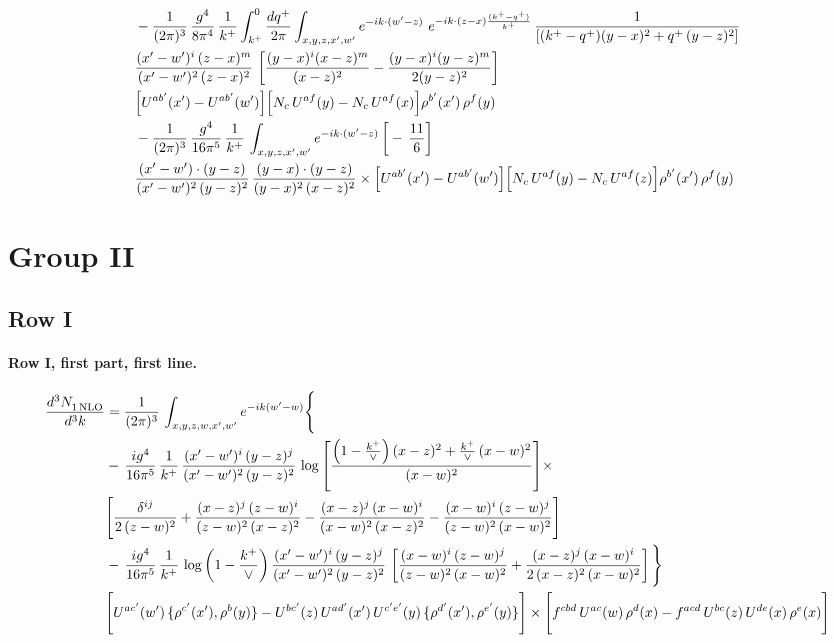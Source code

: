 \documentclass[10pt]{article}
\numberwithin{equation}{section}
\begin{document}
\begin{align}
& - \frac{1}{(2\pi)^{3}}\,\frac{g^{4}}{8\pi^{4}}\,\frac{1}{k^{+}}\int_{k^{+}}^{0}\frac{dq^{+}}{2\pi}\int_{x,y,z,x',w'}e^{-ik\cdot(w'-z)}\ e^{-ik\cdot(z-x)\frac{(k^{+}-q^{+})}{k^{+}}}\,\frac{1}{\left[(k^{+}-q^{+})(y-x)^{2}+q^{+}\,(y-z)^{2}\right]}\notag \\ & \frac{(x'-w')^{i}\,(z-x)^{m}}{(x'-w')^{2}\,(z-x)^{2}}\,\left[\frac{(y-x)^{i}(x-z)^{m}}{(x-z)^{2}}-\frac{(y-x)^{i}(y-z)^{m}}{2(y-z)^{2}}\right]\notag \\ & \Big[U^{ab'}(x')-U^{ab'}(w')\Big]\Big[N_{c}\,U^{af}(y)-N_{c}\,U^{af}(x)\Big]\rho^{b'}(x')\,\rho^{f}(y) \notag \\
& - \frac{1}{(2\pi)^{3}}\,\frac{g^{4}}{16\pi^{5}}\,\frac{1}{k^{+}}\,\int_{x,y,z,x',w'}e^{-ik\cdot(w'-z)}\,\bigg[-\,\frac{11}{6}\bigg]\notag \\ & \frac{(x'-w')\cdot(y-z)}{(x'-w')^{2}\,(y-z)^{2}}\,\frac{(y-x)\cdot(y-z)}{(y-x)^{2}\,(x-z)^{2}}\times\Big[U^{ab'}(x')-U^{ab'}(w')\Big]\Big[N_{c}\,U^{af}(y)-N_{c}\,U^{af}(z)\Big]\rho^{b'}(x')\,\rho^{f}(y) \label{eq:F:G1V2bfin}
\end{align}

\section{Group II}\label{sec:FgII}
\subsection{Row I}
\paragraph{Row I, first part, first line.}
\begin{align}
 \frac{d^{3}N_{1\,\rm NLO}^{\rm}}{d^{3}k}  & =     \frac{1}{(2\pi)^{3}}\,\int_{x,y,z,w,x',w^{\prime}} e^{-ik(w^{\prime}-w)}\Bigg\{\notag \\
& -\, \frac{ig^{4}}{16\pi^{5}}\,\frac{1}{k^{+}}\, \frac{(x'-w')^{i}\,(y-z)^{j}}{(x'-w')^{2}\,(y-z)^{2}}\,\log{\left[\frac{\left(1-\frac{k^{+}}{\vee}\right)(x-z)^{2}+\frac{k^{+}}{\vee}\,(x-w)^{2}}{(x-w)^{2}}\right]}\times\notag \\ &  \Bigg[\frac{\delta^{ij}}{2\,(z-w)^{2}}+\frac{(x-z)^{j}\,(z-w)^{i}}{(z-w)^{2}\,(x-z)^{2}}-\frac{(x-z)^{j}\,(x-w)^{i}}{(x-w)^{2}\,(x-z)^{2}}-\frac{(x-w)^{i}\,(z-w)^{j}}{(z-w)^{2}\,(x-w)^{2}}\Bigg] \notag \\
& -\, \frac{ig^{4}}{16\pi^{5}}\,\frac{1}{k^{+}}\,\log{\left(1-\frac{k^{+}}{\vee}\right)}\,\frac{(x'-w')^{i}\,(y-z)^{j}}{(x'-w')^{2}\,(y-z)^{2}}\,\left[\frac{(x-w)^{i}\,(z-w)^{j}}{(z-w)^{2}\,(x-w)^{2}}+\frac{(x-z)^{j}\,(x-w)^{i}}{2\,(x-z)^{2}\, (x-w)^{2}}\right]\Bigg\} \notag \\ & \Bigg[U^{ac'}(w')\,\{\rho^{c'}(x'),\rho^{b}(y)\}-U^{bc'}(z)\,U^{ad'}(x')\,U^{c'e'}(y)\, \{\rho^{d'}(x'),\rho^{e'}(y)\}\Bigg]\times \Bigg[f^{cbd}\,U^{ac}(w)\,\rho^{d}(x)-f^{acd}\, U^{bc}(z)\,U^{de}(x)\,\rho^{e}(x)\Bigg]\notag \\ \label{eq:F:G2I1A}
\end{align}
\end{document}
